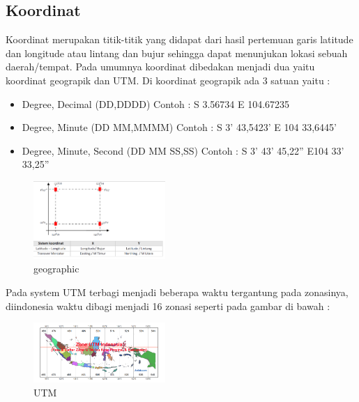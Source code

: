 \subsection{Koordinat}
Koordinat merupakan titik-titik yang didapat dari hasil pertemuan garis latitude dan longitude atau lintang dan bujur sehingga dapat menunjukan lokasi sebuah daerah/tempat. Pada umumnya koordinat dibedakan menjadi dua yaitu koordinat geograpik dan UTM. Di koordinat geograpik ada 3 satuan yaitu :
\begin{itemize}
\item Degree, Decimal (DD,DDDD) Contoh : S 3.56734 E 104.67235
\item Degree, Minute (DD MM,MMMM) Contoh : S 3' 43,5423' E 104 33,6445'
\item Degree, Minute, Second (DD MM SS,SS) Contoh : S 3' 43' 45,22'' E104 33' 33,25''
\end{itemize}

\begin{figure}[H]
	\includegraphics[width=5cm]{figures/1174009/t1.png}
	\centering
	\caption{geographic}
\end{figure}

Pada system UTM terbagi menjadi beberapa  waktu tergantung pada zonasinya, diindonesia waktu dibagi menjadi 16 zonasi seperti pada gambar di bawah :
\begin{figure}[H]
	\includegraphics[width=5cm]{figures/1174009/t2.png}
	\centering
	\caption{UTM}
\end{figure}

